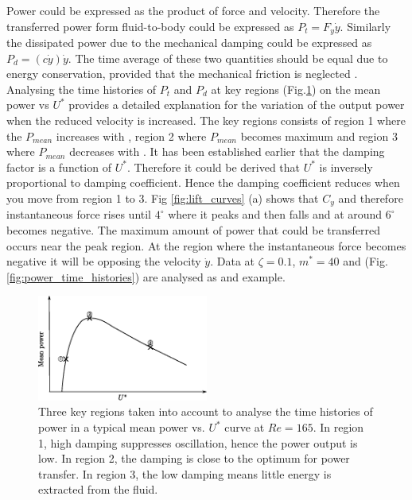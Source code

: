 
 



 
 Power could be expressed as the product of force and velocity. Therefore the transferred power form fluid-to-body could be expressed as $P_t=F_y\dot{y}$. Similarly the dissipated power due to the mechanical damping could be expressed as $P_d=(c\dot{y})\dot{y}$. The time average of these two quantities should be equal due to energy conservation, provided that the mechanical friction is neglected . Analysing the  time histories of $P_t $ and $P_d$ at key regions (Fig.\ref{fig:regions_1}) on the mean power vs $U^*$ provides a detailed explanation for the variation of the output power when the reduced velocity is increased. The key regions consists of region 1 where the $P_{mean}$ increases with \ustar, region 2 where $P_{mean}$ becomes maximum and region 3 where $P_{mean}$ decreases with \ustar. It has been established earlier that the damping factor is a function of $U^*$. Therefore it could be derived that $U^*$ is inversely proportional to damping coefficient. Hence the damping coefficient reduces when you move from region 1 to 3. Fig \ref{fig:lift_curves} (a) shows that $C_y$ and therefore instantaneous force rises until $4^\circ$ where it peaks and then falls and at around $6^\circ$ becomes negative. The maximum amount of power that could be transferred occurs near the peak region. At the region where the instantaneous force becomes negative it will be opposing the velocity $\dot{y}$. Data at $\zeta=0.1$, $m^*=40$ and  (Fig.\ref{fig:power_time_histories}) are analysed as and example.  

\begin{figure}[h!]
\centering
\includegraphics[width=0.5\textwidth]{../FnP/sketch_1}
\caption{ Three key regions taken into account to analyse the time histories of power in a typical mean power vs. $U^*$ curve at $Re=165$. In region 1, high damping suppresses oscillation, hence the power output is low. In region 2, the damping is close to the optimum for power transfer. In region 3, the low damping means little energy is extracted from the fluid.}
\label{fig:regions_1}
\end{figure}

